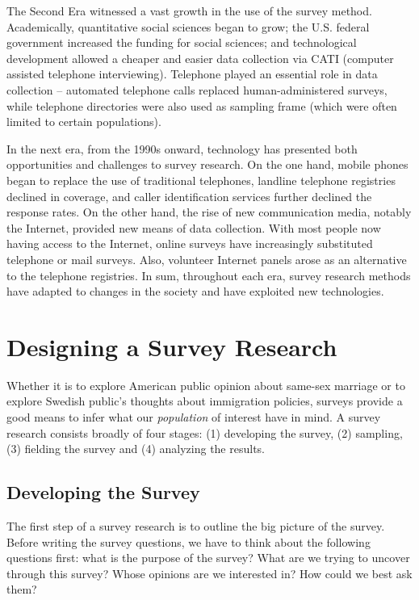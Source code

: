 \documentclass{book}
\begin{document}
The Second Era witnessed a vast growth in the use of the survey method.
Academically, quantitative social sciences began to grow; the U.S. federal
government increased the funding for social sciences; and technological
development allowed a cheaper and easier data collection via CATI (computer
assisted telephone interviewing). Telephone played an essential role in data
collection -- automated telephone calls replaced human-administered surveys,
while telephone directories were also used as sampling frame (which were often
limited to certain populations).

In the next era, from the 1990s onward, technology has presented both
opportunities and challenges to survey research. On the one hand, mobile
phones began to replace the use of traditional telephones, landline telephone
registries declined in coverage, and caller identification services further
declined the response rates. On the other hand, the rise of new communication
media, notably the Internet, provided new means of data collection. With most
people now having access to the Internet, online surveys have increasingly
substituted telephone or mail surveys. Also, volunteer Internet panels arose
as an alternative to the telephone registries. In sum, throughout each era,
survey research methods have adapted to changes in the society and have
exploited new technologies.

\hypertarget{designing-a-survey-research}{%
\section{Designing a Survey Research}\label{designing-a-survey-research}}

Whether it is to explore American public opinion about same-sex marriage or to
explore Swedish public's thoughts about immigration policies, surveys provide
a good means to infer what our \emph{population} of interest have in mind. A
survey research consists broadly of four stages: (1) developing the survey,
(2) sampling, (3) fielding the survey and (4) analyzing the results.

\hypertarget{developing-the-survey}{%
\subsection{Developing the Survey}\label{developing-the-survey}}

The first step of a survey research is to outline the big picture of the
survey. Before writing the survey questions, we have to think about the
following questions first: what is the purpose of the survey? What are we
trying to uncover through this survey? Whose opinions are we interested in?
How could we best ask them?
\end{document}
